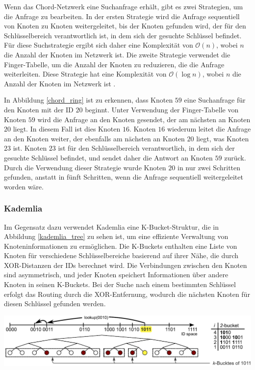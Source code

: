 \noindent Wenn das Chord-Netzwerk eine Suchanfrage erhält, gibt es zwei Strategien, um die Anfrage zu bearbeiten. In der ersten Strategie wird die Anfrage sequentiell von Knoten zu Knoten weitergeleitet, bis der Knoten gefunden wird, der für den Schlüsselbereich verantwortlich ist, in dem sich der gesuchte Schlüssel befindet. Für diese Suchstrategie ergibt sich daher eine Komplexität von $\mathcal{O}(n)$, wobei $n$ die Anzahl der Knoten im Netzwerk ist. Die zweite Strategie verwendet die Finger-Tabelle, um die Anzahl der Knoten zu reduzieren, die die Anfrage weiterleiten. Diese Strategie hat eine Komplexität von $\mathcal{O}(\log n)$, wobei $n$ die Anzahl der Knoten im Netzwerk ist \parencite[S. 810-811]{MedranoChavez_ChordKademliaHighChurnScenarios}. 

In Abbildung \ref{chord_ring} ist zu erkennen, dass Knoten $59$ eine Suchanfrage für den Knoten mit der ID $20$ beginnt. Unter Verwendung der Finger-Tabelle von Knoten $59$ wird die Anfrage an den Knoten gesendet, der am nächsten an Knoten $20$ liegt. In diesem Fall ist dies Knoten $16$. Knoten $16$ wiederum leitet die Anfrage an den Knoten weiter, der ebenfalls am nächsten an Knoten $20$ liegt, was Knoten $23$ ist. Knoten $23$ ist für den Schlüsselbereich verantwortlich, in dem sich der gesuchte Schlüssel befindet, und sendet daher die Antwort an Knoten $59$ zurück. Durch die Verwendung dieser Strategie wurde Knoten $20$ in nur zwei Schritten gefunden, anstatt in fünft Schritten, wenn die Anfrage sequentiell weitergeleitet worden wäre.    

\subsubsection{Kademlia}
Im Gegensatz dazu verwendet Kademlia eine K-Bucket-Struktur, die in Abbildung \ref{kademlia_tree} zu sehen ist, um eine effiziente Verwaltung von Knoteninformationen zu ermöglichen. Die K-Buckets enthalten eine Liste von Knoten für verschiedene Schlüsselbereiche basierend auf ihrer Nähe, die durch XOR-Distanzen der IDs berechnet wird. Die Verbindungen zwischen den Knoten sind asymmetrisch, und jeder Knoten speichert Informationen über andere Knoten in seinen K-Buckets. Bei der Suche nach einem bestimmten Schlüssel erfolgt das Routing durch die XOR-Entfernung, wodurch die nächsten Knoten für diesen Schlüssel gefunden werden.

\begin{center}
    \captionsetup{type=figure}
    \includegraphics[width=1\linewidth]{images/kademlia_tree_altered.png}
    \label{kademlia_tree}
\end{center}

